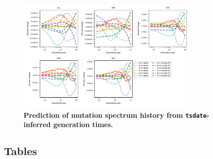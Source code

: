 \documentclass[]{article}
\newcommand{\tsdate}{\texttt{tsdate}\xspace}
\begin{document}
\begin{figure}[ht!]
    \centering
    \includegraphics[width=0.8\textwidth]{../plots/goodness-of-fit.tsdate.pdf}
    \caption{
        \textbf{Prediction of mutation spectrum history from
        \tsdate-inferred generation times.}
    }
    \label{fig:tsdate-fit}
\end{figure}


\clearpage

\subsection*{Tables}
\end{document}
